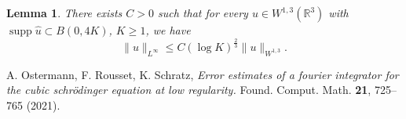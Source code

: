 \documentclass[10pt,a4paper]{article}
\newtheorem{lemma}[theorem]{Lemma}
\DeclareMathOperator{\supp}{supp}
\begin{document}
  \begin{lemma}\label{sobbord}
    There exists \(C>0\) such that for every \(u\in W^{1,3}(\mathbb R^3)\) with
    \(\supp \hat{u} \subset B(0,4K)\), \(K \geq 1\), we have
    \[ \|u\|_{L^\infty} \leq C (\log K)^\frac23 \|u\|_{W^{1,3}}. \]
  \end{lemma}

  \begin{thebibliography}{99}
      {\rm A. Ostermann, F. Rousset, K. Schratz,}
      {\em Error estimates of a fourier integrator for the cubic schr\"odinger equation at low regularity.}
      Found. Comput. Math. \textbf{21}, 725--765 (2021).

  \end{thebibliography}
\end{document}
